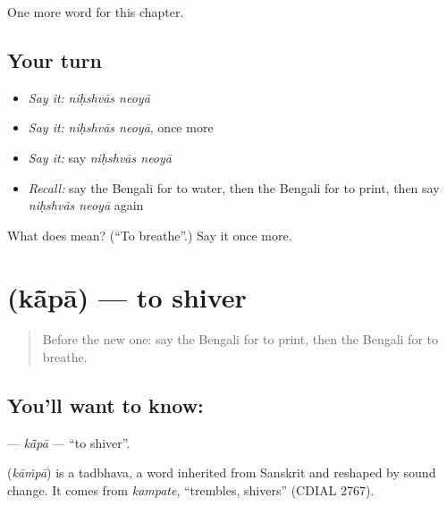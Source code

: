 \begin{grammarlens}[title={What you've built}]
One more word for this chapter.
\end{grammarlens}

\subsection*{Your turn}
\begin{itemize}
\raggedright
  \item \emph{Say it:} \emph{niḥshvās neoyā}
  \item \emph{Say it:} \emph{niḥshvās neoyā}, once more
  \item \emph{Say it:} say \emph{niḥshvās neoyā}
  \item \emph{Recall:} say the Bengali for to water, then the Bengali for to print, then say \emph{niḥshvās neoyā} again
\end{itemize}

\begin{tcolorbox}[breakable,colback=teal!4,colframe=teal!35!black,title={Before you move on}]
What does   mean? (\textquotedblleft{}To breathe\textquotedblright{}.) Say it once more.
\end{tcolorbox}
\section[\texorpdfstring{\bn{কাঁপা} (kā̃pā)}{কাঁপা (kā̃pā)}]{ (kā̃pā) — to shiver}

\label{lesson:BN-C181-kapa}



\begin{quote}
Before the new one: say the Bengali for to print, then the Bengali for to breathe.
\end{quote}

\subsection*{You'll want to know: }
\textbf{} — \emph{kā̃pā} — \textquotedblleft{}to shiver\textquotedblright{}.

\begin{cousinweb}
\textbf{} (\emph{kāṁpā}) is a tadbhava, a word inherited from Sanskrit and reshaped by sound change. It comes from \emph{kampate}, \textquotedblleft{}trembles, shivers\textquotedblright{} (CDIAL 2767).
\end{cousinweb}


